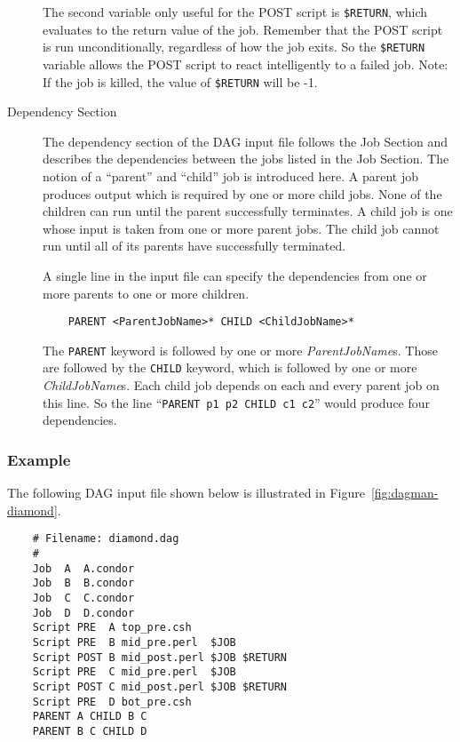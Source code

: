 \begin{description}
The second variable only useful for the POST script is \texttt{\$RETURN}, which
evaluates to the return value of the job.  Remember that the POST script is
run unconditionally, regardless of how the job exits.  So the \texttt{\$RETURN}
variable allows the POST script to react intelligently to a failed job.  Note:
If the job is killed, the value of \texttt{\$RETURN} will be -1.

\item[Dependency Section]

The dependency section of the DAG input file follows the Job Section and
describes the dependencies between the jobs listed in the Job Section.  The
notion of a ``parent'' and ``child'' job is introduced here.  A parent job
produces output which is required by one or more child jobs.  None of the
children can run until the parent successfully terminates.  A child job is one
whose input is taken from one or more parent jobs.  The child job cannot run
until all of its parents have successfully terminated.

A single line in the input file can specify the dependencies from one or more
parents to one or more children.

\begin{verbatim}
	PARENT <ParentJobName>* CHILD <ChildJobName>*
\end{verbatim}

The \texttt{PARENT} keyword is followed by one or more
\textit{ParentJobName}s.  Those are followed by the \texttt{CHILD} keyword,
which is followed by one or more \textit{ChildJobName}s.  Each child job
depends on each and every parent job on this line.  So the line
``\texttt{PARENT p1 p2 CHILD c1 c2}'' would produce four dependencies.

\end{description}

\subsubsection{Example}

The following  DAG input file shown below is illustrated in
Figure~\ref{fig:dagman-diamond}.

\begin{verbatim}
	# Filename: diamond.dag
	#
	Job  A  A.condor 
	Job  B  B.condor 
	Job  C  C.condor	
	Job  D  D.condor
	Script PRE  A top_pre.csh
	Script PRE  B mid_pre.perl  $JOB
	Script POST B mid_post.perl $JOB $RETURN
	Script PRE  C mid_pre.perl  $JOB
	Script POST C mid_post.perl $JOB $RETURN
	Script PRE  D bot_pre.csh
	PARENT A CHILD B C
	PARENT B C CHILD D
\end{verbatim}

